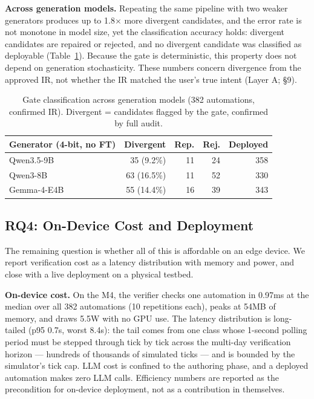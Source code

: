 \documentclass[sigconf,nonacm,anonymous,review]{acmart}
\begin{document}
\textbf{Across generation models.} Repeating the same pipeline with two weaker generators produces up to 1.8$\times$ more divergent candidates, and the error rate is not monotone in model size, yet the classification accuracy holds: divergent candidates are repaired or rejected, and no divergent candidate was classified as deployable (Table~\ref{tab:models}). Because the gate is deterministic, this property does not depend on generation stochasticity. These numbers concern divergence from the approved IR, not whether the IR matched the user's true intent (Layer A; \S9).

\begin{table}[t]
\centering
\caption{Gate classification across generation models (382 automations, confirmed IR). Divergent = candidates flagged by the gate, confirmed by full audit.}
\label{tab:models}
\small
\setlength{\tabcolsep}{4pt}
\begin{tabular}{lrrrr}
\toprule
Generator (4-bit, no FT) & Divergent & Rep. & Rej. & Deployed \\
\midrule
Qwen3.5-9B  & 35 (9.2\%)  & 11 & 24 & 358 \\
Qwen3-8B    & 63 (16.5\%) & 11 & 52 & 330 \\
Gemma-4-E4B & 55 (14.4\%) & 16 & 39 & 343 \\
\bottomrule
\end{tabular}
\end{table}

\subsection{RQ4: On-Device Cost and Deployment}

The remaining question is whether all of this is affordable on an edge device. We report verification cost as a latency distribution with memory and power, and close with a live deployment on a physical testbed.

\textbf{On-device cost.} On the M4, the verifier checks one automation in 0.97ms at the median over all 382 automations (10 repetitions each), peaks at 54MB of memory, and draws 5.5W with no GPU use. The latency distribution is long-tailed (p95 0.7s, worst 8.4s): the tail comes from one class whose 1-second polling period must be stepped through tick by tick across the multi-day verification horizon — hundreds of thousands of simulated ticks — and is bounded by the simulator's tick cap. LLM cost is confined to the authoring phase, and a deployed automation makes zero LLM calls. Efficiency numbers are reported as the precondition for on-device deployment, not as a contribution in themselves.
\end{document}
